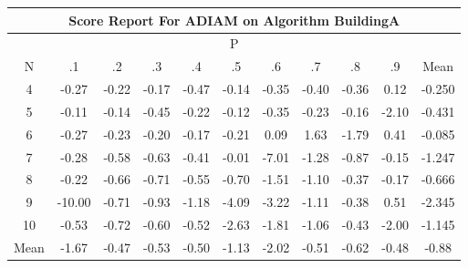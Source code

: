 \documentclass[11pt,a4paper]{report}
\begin{document}
\begin{longtable}{ | c || c | c | c | c | c | c | c | c | c || c |}
\hline
\multicolumn{11}{|c|}{ Score Report For ADIAM on Algorithm BuildingA} \\
\hline
\multicolumn{11}{|c|}{ P } \\
\hline
N & .1 & .2 & .3 & .4 & .5 & .6 & .7 & .8 & .9 & Mean\\
 \hline
 \hline
 \endhead
  4 &  \cellcolor[HTML]{FFF7F7} -0.27 &  \cellcolor[HTML]{FFF7F7} -0.22 &  \cellcolor[HTML]{FFF7F7} -0.17 &  \cellcolor[HTML]{FFF7F7} -0.47 &  \cellcolor[HTML]{FFFFFF} -0.14 &  \cellcolor[HTML]{FFF7F7} -0.35 &  \cellcolor[HTML]{FFF7F7} -0.40 &  \cellcolor[HTML]{FFF7F7} -0.36 &  \cellcolor[HTML]{FFFFFF} 0.12 & -0.250 \\
  5 &  \cellcolor[HTML]{FFFFFF} -0.11 &  \cellcolor[HTML]{FFFFFF} -0.14 &  \cellcolor[HTML]{FFF7F7} -0.45 &  \cellcolor[HTML]{FFF7F7} -0.22 &  \cellcolor[HTML]{FFFFFF} -0.12 &  \cellcolor[HTML]{FFF7F7} -0.35 &  \cellcolor[HTML]{FFF7F7} -0.23 &  \cellcolor[HTML]{FFF7F7} -0.16 &  \cellcolor[HTML]{FFC7C7} -2.10 & -0.431 \\
  6 &  \cellcolor[HTML]{FFF7F7} -0.27 &  \cellcolor[HTML]{FFF7F7} -0.23 &  \cellcolor[HTML]{FFF7F7} -0.20 &  \cellcolor[HTML]{FFF7F7} -0.17 &  \cellcolor[HTML]{FFF7F7} -0.21 &  \cellcolor[HTML]{FFFFFF} 0.09 &  \cellcolor[HTML]{D7D7FF} 1.63 &  \cellcolor[HTML]{FFCFCF} -1.79 &  \cellcolor[HTML]{F7F7FF} 0.41 & -0.085 \\
  7 &  \cellcolor[HTML]{FFF7F7} -0.28 &  \cellcolor[HTML]{FFEFEF} -0.58 &  \cellcolor[HTML]{FFEFEF} -0.63 &  \cellcolor[HTML]{FFF7F7} -0.41 &  \cellcolor[HTML]{FFFFFF} -0.01 &  \cellcolor[HTML]{FF5050} -7.01 &  \cellcolor[HTML]{FFDFDF} -1.28 &  \cellcolor[HTML]{FFE7E7} -0.87 &  \cellcolor[HTML]{FFFFFF} -0.15 & -1.247 \\
  8 &  \cellcolor[HTML]{FFF7F7} -0.22 &  \cellcolor[HTML]{FFEFEF} -0.66 &  \cellcolor[HTML]{FFEFEF} -0.71 &  \cellcolor[HTML]{FFEFEF} -0.55 &  \cellcolor[HTML]{FFEFEF} -0.70 &  \cellcolor[HTML]{FFD7D7} -1.51 &  \cellcolor[HTML]{FFE7E7} -1.10 &  \cellcolor[HTML]{FFF7F7} -0.37 &  \cellcolor[HTML]{FFF7F7} -0.17 & -0.666 \\
  9 &  \cellcolor[HTML]{FF0000} -10.00 &  \cellcolor[HTML]{FFEFEF} -0.71 &  \cellcolor[HTML]{FFE7E7} -0.93 &  \cellcolor[HTML]{FFDFDF} -1.18 &  \cellcolor[HTML]{FF9797} -4.09 &  \cellcolor[HTML]{FFAFAF} -3.22 &  \cellcolor[HTML]{FFE7E7} -1.11 &  \cellcolor[HTML]{FFF7F7} -0.38 &  \cellcolor[HTML]{EFEFFF} 0.51 & -2.345 \\
  10 &  \cellcolor[HTML]{FFEFEF} -0.53 &  \cellcolor[HTML]{FFEFEF} -0.72 &  \cellcolor[HTML]{FFEFEF} -0.60 &  \cellcolor[HTML]{FFEFEF} -0.52 &  \cellcolor[HTML]{FFBFBF} -2.63 &  \cellcolor[HTML]{FFCFCF} -1.81 &  \cellcolor[HTML]{FFE7E7} -1.06 &  \cellcolor[HTML]{FFF7F7} -0.43 &  \cellcolor[HTML]{FFCFCF} -2.00 & -1.145 \\
 \hline
 \hline
Mean &  \cellcolor[HTML]{FFD7D7} -1.67 &  \cellcolor[HTML]{FFF7F7} -0.47 &  \cellcolor[HTML]{FFEFEF} -0.53 &  \cellcolor[HTML]{FFEFEF} -0.50 &  \cellcolor[HTML]{FFDFDF} -1.13 &  \cellcolor[HTML]{FFCFCF} -2.02 &  \cellcolor[HTML]{FFEFEF} -0.51 &  \cellcolor[HTML]{FFEFEF} -0.62 &  \cellcolor[HTML]{FFEFEF} -0.48 &  \cellcolor[HTML]{FFE7E7} -0.88
\end{longtable}
\end{document}
